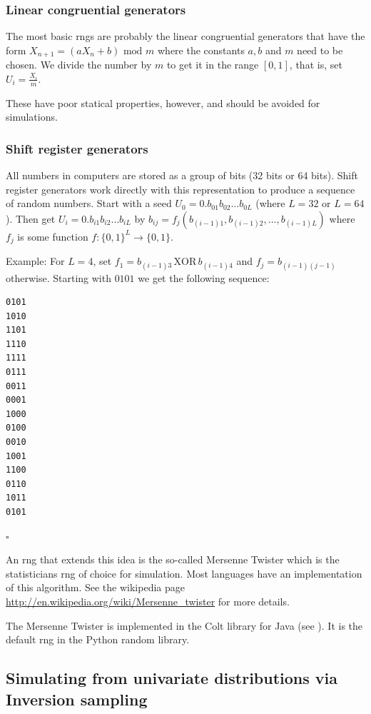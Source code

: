 \documentclass[11pt]{article}
\begin{document}
\subsubsection{Linear congruential generators }

The most basic rngs are probably the linear congruential generators that have the form $X_{n+1} = (aX_n + b) \mbox{ mod }{m}$ where the constants $a, b$ and $m$ need to be chosen.   We divide the number by $m$ to get it in the range $[0,1]$, that is, set $U_i = \frac{X_i}m$.

These have poor statical properties, however, and should be avoided for simulations.

\subsubsection{Shift register generators}

All numbers in computers are stored as a group of bits (32 bits or 64 bits).  Shift register generators work directly with this representation to produce a sequence of random numbers.   Start with a seed $U_0 = 0.b_{01}b_{02}\ldots b_{0L}$ (where $L = 32$ or $L = 64$).  Then get $U_i = 0.b_{i1}b_{i2}\ldots b_{iL}$ by $b_{ij} = f_j(b_{(i-1)1},b_{(i-1)2},\ldots,b_{(i-1)L})$ where $f_j$ is some function  $f: \{0,1\}^L \rightarrow \{ 0,1\}$.  

Example: For $L = 4$, set $f_1 = b_{(i-1)3} \, \mathrm{XOR} \, b_{(i-1)4}$ and $f_j = b_{(i-1)(j-1)}$ otherwise.  Starting with $0101$ we get the following sequence:

\begin{verbatim}
0101
1010
1101
1110
1111
0111
0011
0001
1000
0100
0010
1001
1100
0110
1011
0101
\end{verbatim} \hfill $\square$


An rng that extends this idea is the so-called  Mersenne Twister which is the statisticians rng of choice for simulation.   Most languages have an implementation of this algorithm.  See the  wikipedia page \url{http://en.wikipedia.org/wiki/Mersenne_twister} for more details.

The Mersenne Twister is implemented in the Colt library for Java (see ).  It is the default rng in the Python random library.



\subsection{Simulating from univariate distributions via Inversion sampling}
\end{document}
